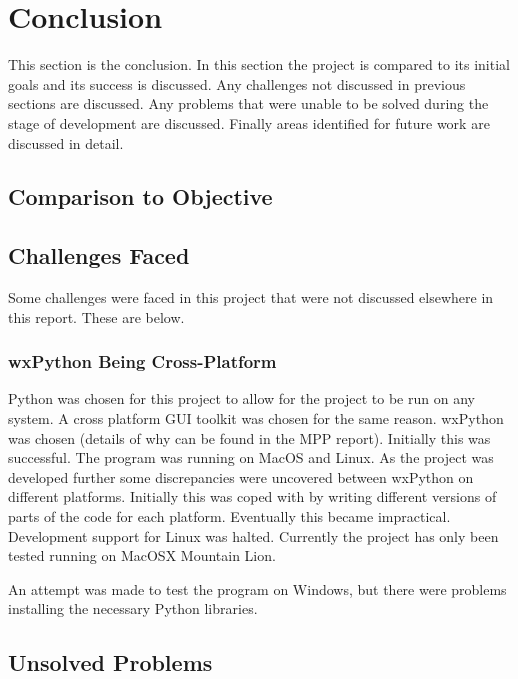 \chapter{Conclusion}

This section is the conclusion.  In this section the project is compared to its initial goals and its success is discussed.  Any challenges not discussed in previous sections are discussed.  Any problems that were unable to be solved during the stage of development are discussed.  Finally areas identified for future work are discussed in detail.

\section{Comparison to Objective}


\section{Challenges Faced}

Some challenges were faced in this project that were not discussed elsewhere in this report.  These are below.

\subsection{wxPython Being Cross-Platform}
Python was chosen for this project to allow for the project to be run on any system.  A cross platform \ac{GUI} toolkit was chosen for the same reason.  wxPython was chosen (details of why can be found in the MPP report).  Initially this was successful.  The program was running on MacOS and Linux.  As the project was developed further some discrepancies were uncovered between wxPython on different platforms.  Initially this was coped with by writing different versions of parts of the code for each platform.  Eventually this became impractical.  Development support for Linux was halted.  Currently the project has only been tested running on MacOSX Mountain Lion.

An attempt was made to test the program on Windows, but there were problems installing the necessary Python libraries.

\section{Unsolved Problems}

